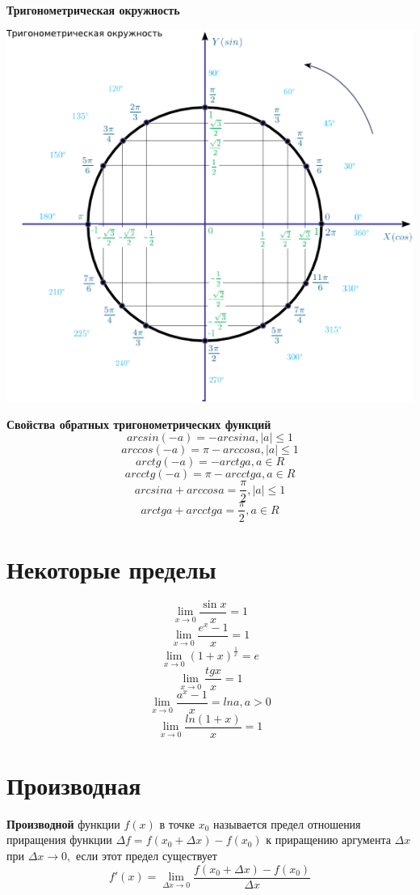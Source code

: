 \documentclass[a5paper, 8pt]{extarticle}
\begin{document}
\newpage
\textbf{Тригонометрическая окружность}

\begin{center}
\includegraphics[width=0.9\linewidth]{trig_circle2.png}
\end{center}

\textbf{Свойства обратных тригонометрических функций}
$$arcsin(-a)=-arcsin a, |a|\le 1$$
$$arccos(-a)=\pi-arccos a, |a|\le 1$$
$$arctg(-a)=-arctg a, a\in R$$
$$arcctg(-a)=\pi-arcctg a, a\in R$$
$$arcsin a+ arccos a=\frac{\pi}{2}, |a|\le 1$$
$$arctg a+ arcctg a=\frac{\pi}{2}, a\in R$$

\section{Некоторые пределы}
$$\lim\limits_{x\to 0}\frac{\sin x}{x}=1$$
$$\lim\limits_{x\to 0}\frac{e^x-1}{x}=1$$
$$\lim\limits_{x\to 0}(1+x)^{\frac{1}{x}}=e$$
$$\lim\limits_{x\to 0}\frac{tg x}{x}=1$$
$$\lim\limits_{x\to 0}\frac{a^x-1}{x}=ln a, a>0$$
$$\lim\limits_{x\to 0}\frac{ln(1+x)}{x}=1$$

\section{Производная}

\textbf{Производной} функции $f(x)$  в точке $x_0$ называется  предел отношения приращения функции $\Delta f=f(x_0+\Delta x)-f(x_0)$ к приращению аргумента $\Delta x$ при $\Delta x\to 0,$ если этот предел существует
$$
f'(x)=\lim\limits_{\Delta x\to 0}\frac{f(x_0+\Delta x)-f(x_0)}{\Delta x}
$$
\end{document}
